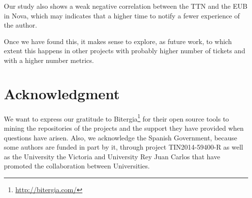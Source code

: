 \documentclass[10pt, conference]{IEEEtran}
\begin{document}
Our study also shows a weak negative correlation between the TTN and the EUB in Nova, which may indicates that a higher time to notify a fewer experience of the author. 

Once we have found this, it makes sense to explore, as future work, to which extent this happens in other projects with probably higher number of tickets and with a higher number metrics.

\section*{Acknowledgment}


We want to express our gratitude to Bitergia\footnote{\url{http://bitergia.com/}} for their open source tools to mining the repositories of the projects and the support they have provided when questions have arisen. Also, we acknowledge the Spanish Government, because some authors are funded in part by it, through project TIN2014-59400-R as well as the University the Victoria and University Rey Juan Carlos that have promoted the collaboration between Universities.



%
%
%


\newpage


 


\end{document}
